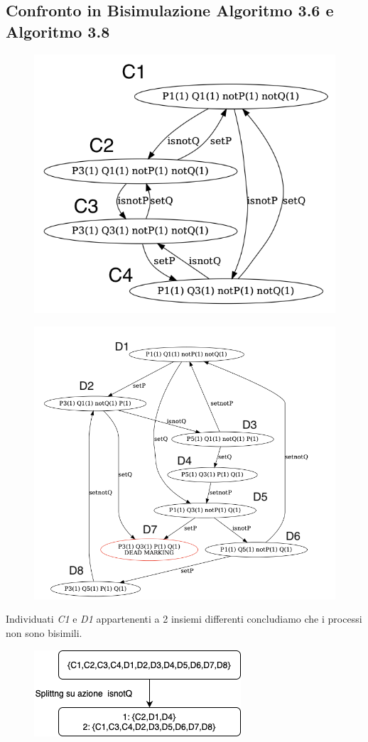 \documentclass{article}
\begin{document}
\subsection{Confronto in Bisimulazione Algoritmo 3.6 e Algoritmo 3.8}
\begin{figure}[h] 
\centering
\includegraphics[scale=0.36]{BIS3.6.png}
\end{figure}
\begin{figure}[h] 
\centering
\includegraphics[scale=0.36]{Bis3-8.png}
\end{figure}
Individuati \textit{C1} e \textit{D1} appartenenti a 2 insiemi differenti concludiamo che i processi non sono bisimili.
\begin{figure}[h] 
\centering
\includegraphics[scale=0.5]{Untitled Diagram-5.png}
\end{figure}
\clearpage
\end{document}
